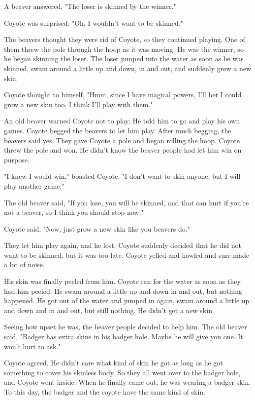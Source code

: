 A beaver answered, "The loser is skinned by the winner."

Coyote was surprised. "Oh, I wouldn't want to be skinned."

The beavers thought they were rid of Coyote, so they continued playing. One of them threw the pole through the hoop as it was moving. He was the winner, so he began skinning the loser. The loser jumped into the water as soon as he was skinned, swam around a little up and down, in and out, and suddenly grew a new skin.

Coyote thought to himself, "Hmm, since I have magical powers, I'll bet I could grow a new skin too. I think I'll play with them."

An old beaver warned Coyote not to play. He told him to go and play his own games. Coyote begged the beavers to let him play. After much begging, the beavers said yes. They gave Coyote a pole and began rolling the hoop. Coyote threw the pole and won. He didn't know the beaver people had let him win on purpose.

"I knew I would win," boasted Coyote. "I don't want to skin anyone, but I will play another game."

The old beaver said, "If you lose, you will be skinned, and that can hurt if you're not a beaver, so I think you should stop now."

Coyote said, "Now, just grow a new skin like you beavers do."

They let him play again, and he lost. Coyote suddenly decided that he did not want to be skinned, but it was too late. Coyote yelled and howled and sure made a lot of noise.

His skin was finally peeled from him. Coyote ran for the water as soon as they had him peeled. He swam around a little up and down in and out, but nothing happened. He got out of the water and jumped in again, swam around a little up and down and in and out, but still nothing. He didn't get a new skin.

Seeing how upset he was, the beaver people decided to help him. The old beaver said, "Badger has extra skins in his badger hole. Maybe he will give you one. It won't hurt to ask."

Coyote agreed. He didn't care what kind of skin he got as long as he got something to cover his skinless body. So they all went over to the badger hole, and Coyote went inside. When he finally came out, he was wearing a badger skin. To this day, the badger and the coyote have the same kind of skin.


